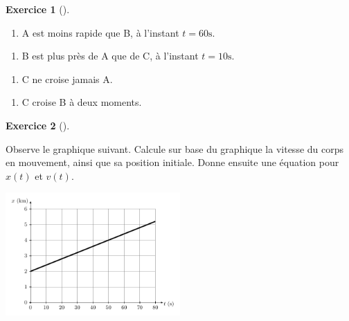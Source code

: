 \documentclass[
  letterpaper,
  DIV=11,
  numbers=noendperiod]{scrartcl}
\providecommand{\tightlist}{%
  \setlength{\itemsep}{0pt}\setlength{\parskip}{0pt}}\usepackage{longtable,booktabs,array}
\theoremstyle{definition}
\theoremstyle{definition}
\newtheorem{exercise}{Exercice}[section]
\theoremstyle{remark}
\begin{document}
\begin{exercise}[]
\begin{enumerate}
\def\labelenumi{\arabic{enumi}.}
\setcounter{enumi}{4}
\tightlist
\item
  A est moins rapide que B, à l'instant \(t=60\text{s}\).
\end{enumerate}

\vspace{2cm}

\begin{enumerate}
\def\labelenumi{\arabic{enumi}.}
\setcounter{enumi}{5}
\tightlist
\item
  B est plus près de A que de C, à l'instant \(t=10\text{s}\).
\end{enumerate}

\vspace{2cm}

\begin{enumerate}
\def\labelenumi{\arabic{enumi}.}
\setcounter{enumi}{6}
\tightlist
\item
  C ne croise jamais A.
\end{enumerate}

\vspace{2cm}

\begin{enumerate}
\def\labelenumi{\arabic{enumi}.}
\setcounter{enumi}{7}
\tightlist
\item
  C croise B à deux moments.
\end{enumerate}

\vspace{2cm}

\end{exercise}

\newpage

\begin{exercise}[]\protect\hypertarget{exr-calcul-2}{}\label{exr-calcul-2}

Observe le graphique suivant. Calcule sur base du graphique la vitesse
du corps en mouvement, ainsi que sa position initiale. Donne ensuite une
équation pour \(x(t)\) et \(v(t)\).

\begin{center}
\includegraphics[width=0.5\textwidth,height=\textheight]{figures/mru/fig12.pdf}
\end{center}

\end{exercise}
\end{document}
